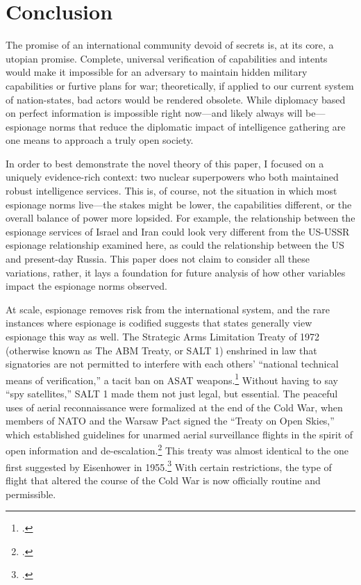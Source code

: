 \documentclass[14pt]{extarticle}
\begin{document}
\section{Conclusion}
The promise of an international community devoid of secrets is, at its core, a utopian promise. Complete, universal verification of capabilities and intents would make it impossible for an adversary to maintain hidden military capabilities or furtive plans for war; theoretically, if applied to our current system of nation-states, bad actors would be rendered obsolete. While diplomacy based on perfect information is impossible right now---and likely always will be---espionage norms that reduce the diplomatic impact of intelligence gathering are one means to approach a truly open society.

In order to best demonstrate the novel theory of this paper, I focused on a uniquely evidence-rich context: two nuclear superpowers who both maintained robust intelligence services. This is, of course, not the situation in which most espionage norms live---the stakes might be lower, the capabilities different, or the overall balance of power more lopsided. For example, the relationship between the espionage services of Israel and Iran could look very different from the US-USSR espionage relationship examined here, as could the relationship between the US and present-day Russia. This paper does not claim to consider all these variations, rather, it lays a foundation for future analysis of how other variables impact the espionage norms observed.

At scale, espionage removes risk from the international system, and the rare instances where espionage is codified suggests that states generally view espionage this way as well. The Strategic Arms Limitation Treaty of 1972 (otherwise known as The ABM Treaty, or SALT 1) enshrined in law that signatories are not permitted to interfere with each others' ``national technical means of verification,'' a tacit ban on ASAT weapons.\footcite[p.~431]{mcdougall_heavens_1985} Without having to say ``spy satellites,'' SALT 1 made them not just legal, but essential. The peaceful uses of aerial reconnaissance were formalized at the end of the Cold War, when members of NATO and the Warsaw Pact signed the \enquote{Treaty on Open Skies,} which established guidelines for unarmed aerial surveillance flights in the spirit of open information and de-escalation.\footcite{organization_for_security_and_co-operation_in_europe_treaty_1992} This treaty was almost identical to the one first suggested by Eisenhower in 1955.\footcite{center_for_arms_control_and_non-proliferation_fact_2017} With certain restrictions, the type of flight that altered the course of the Cold War is now officially routine and permissible.
\end{document}
